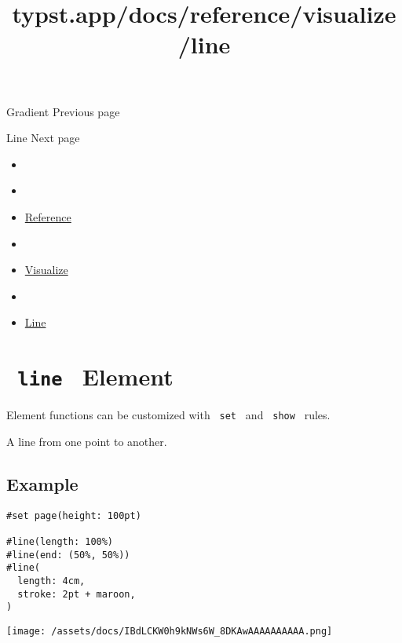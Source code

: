 \href{/docs/reference/visualize/gradient/}{\pandocbounded{}}

{ Gradient } { Previous page }

\href{/docs/reference/visualize/line/}{\pandocbounded{}}

{ Line } { Next page }


\title{typst.app/docs/reference/visualize/line}

\begin{itemize}
\tightlist
\item
  \href{/docs}{}
\item
  
\item
  \href{/docs/reference/}{Reference}
\item
  
\item
  \href{/docs/reference/visualize/}{Visualize}
\item
  
\item
  \href{/docs/reference/visualize/line/}{Line}
\end{itemize}

\section{\texorpdfstring{\texttt{\ line\ } {{ Element
}}}{ line   Element }}\label{summary}

\label{element-tooltip}
Element functions can be customized with \texttt{\ set\ } and
\texttt{\ show\ } rules.

A line from one point to another.

\subsection{Example}\label{example}

\begin{verbatim}
#set page(height: 100pt)

#line(length: 100%)
#line(end: (50%, 50%))
#line(
  length: 4cm,
  stroke: 2pt + maroon,
)
\end{verbatim}

\texttt{[image: /assets/docs/IBdLCKW0h9kNWs6W\_8DKAwAAAAAAAAAA.png]}

